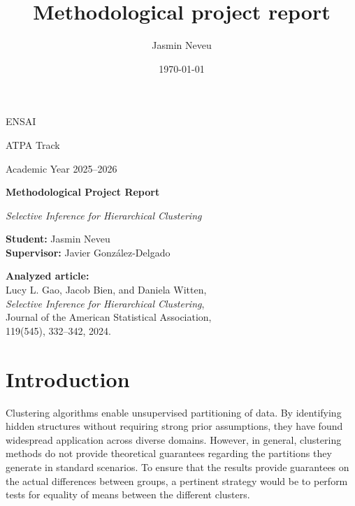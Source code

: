 \documentclass[a4paper,11pt]{article}
\title{Methodological project report}
\author{Jasmin Neveu}
\date{\today}
\theoremstyle{plain}
\newcommand{\1}{\mathbf{1}}
\begin{document}
\begin{titlepage}
    \centering

    {\Large ENSAI \par}
    \vspace{2cm}
    {\large ATPA Track \par}
    {\large Academic Year 2025--2026 \par}
    \vspace{2cm}
    {\Huge\bfseries Methodological Project Report \par}
    \vspace{0.4cm}
    {\LARGE\itshape Selective Inference for Hierarchical Clustering \par}
    \vspace{2cm}
    \begin{flushleft}
        \textbf{Student:} Jasmin Neveu \\
        \vspace{0.2cm}
        \textbf{Supervisor:} Javier González-Delgado
    \end{flushleft}
    \vspace{1cm}
    \begin{flushleft}
        \textbf{Analyzed article:} \\
        Lucy L. Gao, Jacob Bien, and Daniela Witten, \\
        \textit{Selective Inference for Hierarchical Clustering}, \\
        Journal of the American Statistical Association,\\ 119(545), 332–342, 2024.\\
    \end{flushleft}
    \vspace{1cm}
\end{titlepage}

\tableofcontents
\newpage

\section{Introduction}


Clustering algorithms enable unsupervised partitioning of data. By identifying hidden structures without requiring strong prior assumptions, they have found widespread application across diverse domains.
However, in general, clustering methods do not provide theoretical guarantees regarding the partitions they generate in standard scenarios.
To ensure that the results provide guarantees on the actual differences between groups, a pertinent strategy would be to perform tests for equality of means between the different clusters. 
\end{document}
